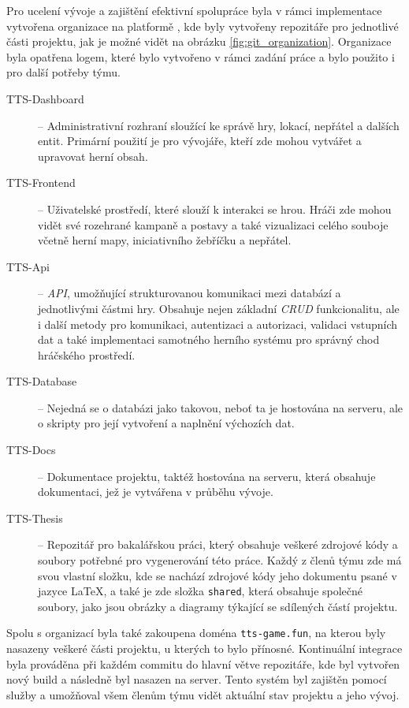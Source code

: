 Pro ucelení vývoje a zajištění efektivní spolupráce byla v rámci implementace vytvořena organizace  na platformě , kde byly vytvořeny repozitáře pro jednotlivé části projektu, jak je možné vidět na obrázku \ref{fig:git_organization}. Organizace byla opatřena logem, které bylo vytvořeno v rámci zadání práce a bylo použito i pro další potřeby týmu.

\begin{description}
    \item [TTS-Dashboard] -- Administrativní rozhraní sloužící ke správě hry, lokací, nepřátel a dalších entit. Primární použití je pro vývojáře, kteří zde mohou vytvářet a upravovat herní obsah.
    \item [TTS-Frontend] -- Uživatelské prostředí, které slouží k interakci se hrou. Hráči zde mohou vidět své rozehrané kampaně a postavy a také vizualizaci celého souboje včetně herní mapy, iniciativního žebříčku a nepřátel.
    \item [TTS-Api] -- \textit{API}, umožňující strukturovanou komunikaci mezi databází a jednotlivými částmi hry. Obsahuje nejen základní \textit{CRUD} funkcionalitu, ale i další metody pro komunikaci, autentizaci a autorizaci, validaci vstupních dat a také implementaci samotného herního systému pro správný chod hráčského prostředí.
    \item [TTS-Database] -- Nejedná se o databázi jako takovou, neboť ta je hostována na serveru, ale o skripty pro její vytvoření a naplnění výchozích dat.
    \item [TTS-Docs] -- Dokumentace projektu, taktéž hostována na serveru, která obsahuje dokumentaci, jež je vytvářena v průběhu vývoje.
    \item [TTS-Thesis] -- Repozitář pro bakalářskou práci, který obsahuje veškeré zdrojové kódy a soubory potřebné pro vygenerování této práce. Každý z členů týmu zde má svou vlastní složku, kde se nachází zdrojové kódy jeho dokumentu psané v jazyce \LaTeX, a také je zde složka \texttt{shared}, která obsahuje společné soubory, jako jsou obrázky a diagramy týkající se sdílených částí projektu. 
\end{description}

Spolu s organizací byla také zakoupena doména \texttt{tts-game.fun}, na kterou byly nasazeny veškeré části projektu, u kterých to bylo přínosné. Kontinuální integrace byla prováděna při každém commitu do hlavní větve repozitáře, kde byl vytvořen nový build a následně byl nasazen na server. Tento systém byl zajištěn pomocí služby  a umožňoval všem členům týmu vidět aktuální stav projektu a jeho vývoj.

